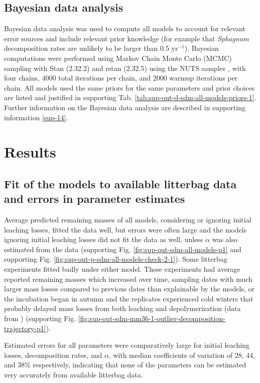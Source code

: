 \documentclass[bg, manuscript]{copernicus}
\begin{document}
\subsection{Bayesian data analysis}

Bayesian data analysis was used to compute all models to account for relevant error sources and include relevant prior knowledge (for example that \emph{Sphagnum} decomposition rates are unlikely to be larger than 0.5 yr\(^{-1}\)). Bayesian computations were performed using Markov Chain Monte Carlo (MCMC) sampling with Stan (2.32.2) \citep{StanDevelopmentTeam.2021a} and rstan (2.32.5) \citep{StanDevelopmentTeam.2021b} using the NUTS sampler \citep{Hoffman.2014}, with four chains, 4000 total iterations per chain, and 2000 warmup iterations per chain. All models used the same priors for the same parameters and prior choices are listed and justified in supporting Tab. \ref{tab:sup-out-d-sdm-all-models-priors-1}. Further information on the Bayesian data analysis are described in supporting information \ref{sup-14}.

\section{Results}

\subsection{Fit of the models to available litterbag data and errors in parameter estimates}

Average predicted remaining masses of all models, considering or ignoring initial leaching losses, fitted the data well, but errors were often large and the models ignoring initial leaching losses did not fit the data as well, unless \(\alpha\) was also estimated from the data (supporting Fig. \ref{fig:sup-out-sdm-all-models-p1} and supporting Fig. \ref{fig:sup-out-p-sdm-all-models-check-2-1}).
Some litterbag experiments fitted badly under either model. These experiments had average reported remaining masses which increased over time, sampling dates with much larger mass losses compared to previous dates than explainable by the models, or the incubation began in autumn and the replicates experienced cold winters that probably delayed mass losses from both leaching and depolymerization (data from \citet{Golovatskaya.2017}) (supporting Fig. \ref{fig:sup-out-sdm-mm36-1-outlier-decomposition-trajectory-p1}).

Estimated errors for all parameters were comparatively large for initial leaching losses, decomposition rates, and \(\alpha\), with median coefficients of variation of 28, 44, and 38\% respectively, indicating that none of the parameters can be estimated very accurately from available litterbag data.
\end{document}
